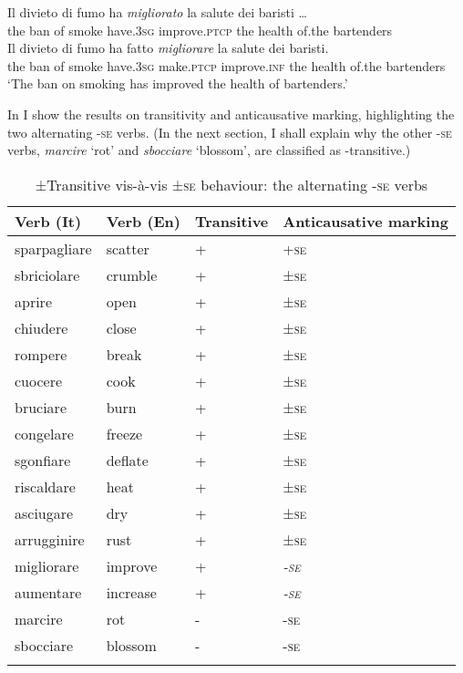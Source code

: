 \documentclass[output=paper,colorlinks,citecolor=brown
]{langscibook}
\begin{document}
\ea \label{bentley_example_12}
    \ea \label{bentley_example_12a}
    \gll 	Il		divieto		di		fumo		ha							\textit{migliorato}				la		salute		dei				baristi \ldots  \\
    						the	ban				of		smoke	have.3\textsc{sg}		improve.\textsc{ptcp}		the	health	of.the		bartenders				\\
    \ex \label{bentley_example_12b}
    \gll Il		divieto		di		fumo		ha							fatto						\textit{migliorare} 	la 	salute 	dei			 baristi. \\
   	the	ban				of		smoke	have.3\textsc{sg}		make.\textsc{ptcp}	improve.\textsc{inf}	the	health	of.the		bartenders \\
    \glt 					‘The ban on smoking has improved the health of bartenders.’
    \z
\z

In  I show the results on transitivity and anticausative marking, highlighting the two alternating -\textsc{se} verbs. (In the next section, I shall explain why the other -\textsc{se} verbs, \textit{marcire} ‘rot’ and \textit{sbocciare} ‘blossom’, are classified as -transitive.)

\begin{table}[hbt!]
\caption{±Transitive vis-à-vis ±\textsc{se} behaviour: the alternating -\textsc{se} verbs}
\label{tab:bentley_table_3}
\begin{tabular}{llll}
\lsptoprule
Verb (It)    & Verb (En) & Transitive & Anticausative marking \\
\midrule
sparpagliare & scatter   & +          & +\textsc{se}  \\
sbriciolare  & crumble   & +          & ±\textsc{se}  \\
aprire       & open      & +          & ±\textsc{se}  \\
chiudere     & close     & +          & ±\textsc{se}  \\
rompere      & break     & +          & ±\textsc{se}  \\
cuocere      & cook      & +          & ±\textsc{se}  \\
bruciare     & burn      & +          & ±\textsc{se}  \\
congelare    & freeze    & +          & ±\textsc{se}  \\
sgonfiare    & deflate   & +          & ±\textsc{se}  \\
riscaldare   & heat      & +          & ±\textsc{se}  \\
asciugare    & dry       & +          & ±\textsc{se}  \\
arrugginire  & rust      & +          & ±\textsc{se}  \\
migliorare   & improve   & +          & \textit{-\textsc{se}}   \\
aumentare    & increase  & +          & \textit{-\textsc{se}}   \\
marcire      & rot       & -          & -\textsc{se}  \\
sbocciare    & blossom   & -          & -\textsc{se}  \\              
\lspbottomrule
\end{tabular}
\end{table}
\end{document}
